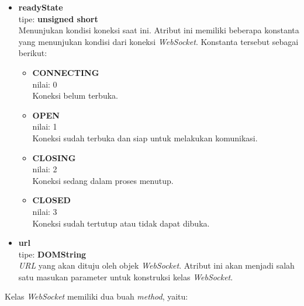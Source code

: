 \begin{itemize}
	\item \textbf{readyState} \\ tipe: \textbf{unsigned short} \\ Menunjukan kondisi koneksi saat ini. Atribut ini memiliki beberapa konstanta yang menunjukan kondisi dari koneksi \textit{WebSocket}. Konstanta tersebut sebagai berikut:
		\begin{itemize}
			\item \textbf{CONNECTING} \\ nilai: 0 \\ Koneksi belum terbuka.
			\item \textbf{OPEN} \\ nilai: 1 \\ Koneksi sudah terbuka dan siap untuk melakukan komunikasi.
			\item \textbf{CLOSING} \\ nilai: 2 \\ Koneksi sedang dalam proses menutup.
			\item \textbf{CLOSED} \\ nilai: 3 \\ Koneksi sudah tertutup atau tidak dapat dibuka.
		\end{itemize}
	
	\item \textbf{url} \\ tipe: \textbf{DOMString} \\ \textit{URL} yang akan dituju oleh objek \textit{WebSocket}. Atribut ini akan menjadi salah satu masukan parameter untuk konstruksi kelas \textit{WebSocket}.
\end{itemize}

Kelas \textit{WebSocket} memiliki dua buah \textit{method}, yaitu:

